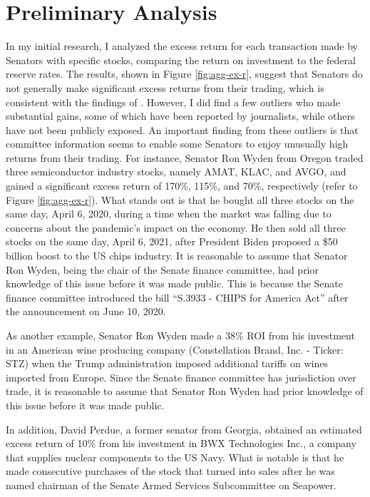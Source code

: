 \documentclass[15pt,letterpaper]{article}
\begin{document}
\section{Preliminary Analysis}\label{prelim}
In my initial research, I analyzed the excess return for each transaction made by Senators with specific stocks, comparing the return on investment to the federal reserve rates. The results, shown in Figure \ref{fig:agg-ex-r}, suggest that Senators do not generally make significant excess returns from their trading, which is consistent with the findings of \cite{eg13}. However, I did find a few outliers who made substantial gains, some of which have been reported by journalists, while others have not been publicly exposed. An important finding from these outliers is that committee information seems to enable some Senators to enjoy unusually high returns from their trading. 
For instance, Senator Ron Wyden from Oregon traded three semiconductor industry stocks, namely AMAT, KLAC, and AVGO, and gained a significant excess return of 170\%, 115\%, and 70\%, respectively (refer to Figure \ref{fig:agg-ex-r}). What stands out is that he bought all three stocks on the same day, April 6, 2020, during a time when the market was falling due to concerns about the pandemic's impact on the economy. He then sold all three stocks on the same day, April 6, 2021, after President Biden proposed a \$50 billion boost to the US chips industry. It is reasonable to assume that Senator Ron Wyden, being the chair of the Senate finance committee, had prior knowledge of this issue before it was made public. This is because the Senate finance committee introduced the bill ``S.3933 - CHIPS for America Act'' after the announcement on June 10, 2020.

As another example, Senator Ron Wyden made a 38\% ROI from his investment in an American wine producing company (Constellation Brand, Inc. - Ticker: STZ) when the Trump administration imposed additional tariffs on wines imported from Europe.
Since the Senate finance committee has jurisdiction over trade, it is reasonable to assume that Senator Ron Wyden had prior knowledge of this issue before it was made public.

In addition, David Perdue, a former senator from Georgia, obtained an estimated excess return of 10\% from his investment in BWX Technologies Inc., a company that supplies nuclear components to the US Navy. What is notable is that he made consecutive purchases of the stock that turned into sales after he was named chairman of the Senate Armed Services Subcommittee on Seapower.
\end{document}
